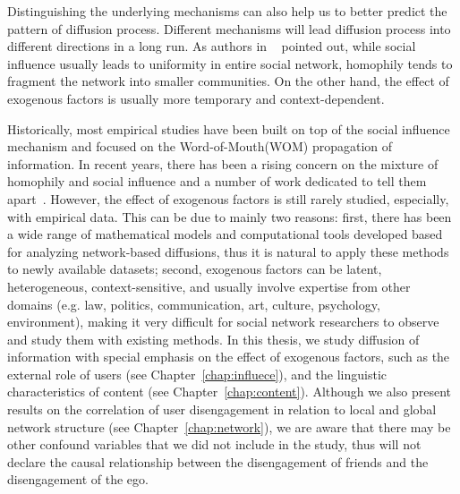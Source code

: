 \documentclass[phd,tocprelim]{cornell}
\begin{document}
Distinguishing the underlying mechanisms can also help us to better predict the pattern of diffusion process. Different mechanisms will lead diffusion process into different directions in a long run. As authors in ~\cite{Crandall:2008} pointed out, while social influence usually leads to uniformity in entire social network, homophily tends to fragment the network into smaller communities. On the other hand, the effect of exogenous factors is usually more temporary and context-dependent.

Historically, most empirical studies have been built on top of the social influence mechanism and focused on the Word-of-Mouth(WOM) propagation of information. In recent years, there has been a rising concern on the mixture of homophily and social influence and a number of work dedicated to tell them apart~\cite{Anagnostopoulos-2008,Crandall:2008,Aral:2009,Aral-2012}. However, the effect of exogenous factors is still rarely studied, especially, with empirical data. This can be due to mainly two reasons: first, there has been a wide range of mathematical models and computational tools developed based for analyzing network-based diffusions, thus it is natural to apply these methods to newly available datasets; second, exogenous factors can be latent, heterogeneous, context-sensitive, and usually involve expertise from other domains (e.g. law, politics, communication, art, culture, psychology, environment), making it very difficult for social network researchers to observe and study them with existing methods. In this thesis, we study diffusion of information with special emphasis on the effect of exogenous factors, such as the external role of users (see Chapter~\ref{chap:influece}), and the linguistic characteristics of content (see Chapter~\ref{chap:content}). Although we also present results on the correlation of user disengagement in relation to local and global network structure (see Chapter~\ref{chap:network}), we are aware that there may be other confound variables that we did not include in the study, thus will not declare the causal relationship between the disengagement of friends and the disengagement of the ego. 


\end{document}
